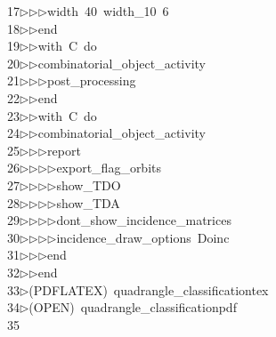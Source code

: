 \begin{tabbing}
17\>$\triangleright$\>$\triangleright$\>$\triangleright$\>width\ 40\ width\_10\ 6\ \\[0pt]
18\>$\triangleright$\>$\triangleright$\>end\ \\[0pt]
19\>$\triangleright$\>$\triangleright$\>with\ C\ do\ \\[0pt]
20\>$\triangleright$\>$\triangleright$\>combinatorial\_object\_activity\ \\[0pt]
21\>$\triangleright$\>$\triangleright$\>$\triangleright$\>post\_processing\ \\[0pt]
22\>$\triangleright$\>$\triangleright$\>end\ \\[0pt]
23\>$\triangleright$\>$\triangleright$\>with\ C\ do\ \\[0pt]
24\>$\triangleright$\>$\triangleright$\>combinatorial\_object\_activity\ \\[0pt]
25\>$\triangleright$\>$\triangleright$\>$\triangleright$\>report\ \\[0pt]
26\>$\triangleright$\>$\triangleright$\>$\triangleright$\>$\triangleright$\>export\_flag\_orbits\ \\[0pt]
27\>$\triangleright$\>$\triangleright$\>$\triangleright$\>$\triangleright$\>show\_TDO\ \\[0pt]
28\>$\triangleright$\>$\triangleright$\>$\triangleright$\>$\triangleright$\>show\_TDA\ \\[0pt]
29\>$\triangleright$\>$\triangleright$\>$\triangleright$\>$\triangleright$\>dont\_show\_incidence\_matrices\ \\[0pt]
30\>$\triangleright$\>$\triangleright$\>$\triangleright$\>$\triangleright$\>incidence\_draw\_options\ Doinc\ \\[0pt]
31\>$\triangleright$\>$\triangleright$\>$\triangleright$\>end\ \\[0pt]
32\>$\triangleright$\>$\triangleright$\>end\\[0pt]
33\>$\triangleright$\>(PDFLATEX)\ quadrangle\_classificationtex\\[0pt]
34\>$\triangleright$\>(OPEN)\ quadrangle\_classificationpdf\\[0pt]
35\>\end{tabbing}
